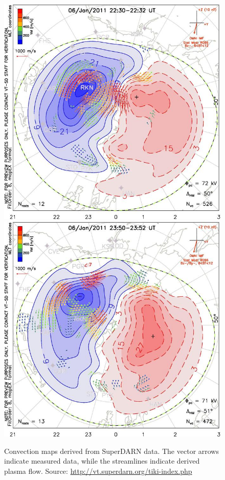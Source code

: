 \documentclass[norsk,a4paper,12pt]{article}
\begin{document}
\begin{multicols}{2}
\begin{figure}[H]
	\includegraphics[scale = 0.9]{Figures/Superdarn/superdarn_22_32.jpg}
	\includegraphics[scale = 0.9]{Figures/Superdarn/superdarn_23_52.jpg}
	\centering
	\caption{Convection maps derived from SuperDARN data. The vector arrows indicate measured data, while the streamlines indicate derived plasma flow. Source: \url{http://vt.superdarn.org/tiki-index.php}}
	\label{fig:superdarn_data}
\end{figure}


\end{multicols}
\end{document}
